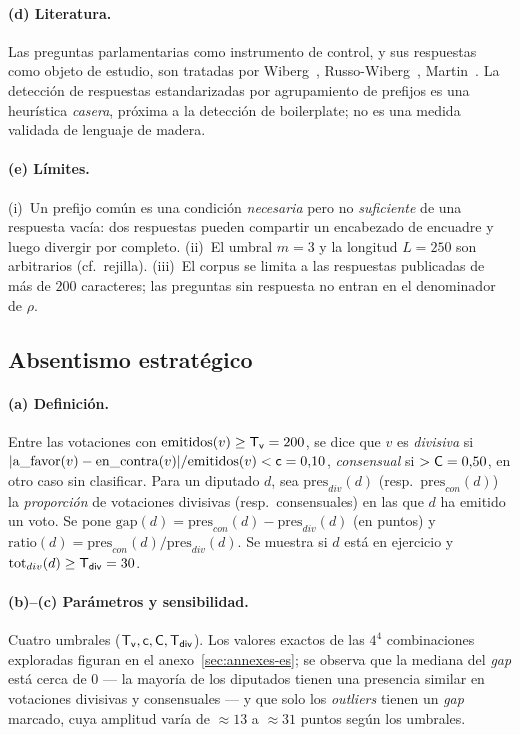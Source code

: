 \paragraph{(d) Literatura.} Las preguntas parlamentarias como instrumento de
control, y sus respuestas como objeto de estudio, son tratadas por
Wiberg~\cite{wiberg1995}, Russo-Wiberg~\cite{rw2010}, Martin~\cite{martin2011}. La
detección de respuestas estandarizadas por agrupamiento de prefijos es una
heurística \emph{casera}, próxima a la detección de \og{}boilerplate\fg{}; no es una
medida validada de \og{}lenguaje de madera\fg{}.

\paragraph{(e) Límites.} (i)~Un prefijo común es una condición \emph{necesaria} pero
no \emph{suficiente} de una respuesta \og{}vacía\fg{}: dos respuestas pueden
compartir un encabezado de encuadre y luego divergir por completo. (ii)~El umbral
$m=3$ y la longitud $L=250$ son arbitrarios (cf.~rejilla). (iii)~El corpus se limita
a las respuestas publicadas de más de $200$ caracteres; las preguntas sin respuesta
no entran en el denominador de $\rho$.

\subsection{Absentismo estratégico}\label{sec:absence-es}

\paragraph{(a) Definición.} Entre las votaciones con $\text{emitidos}(v)\ge \mathsf{T_v}=200$,
se dice que $v$ es \emph{divisiva} si
$|\mathrm{a\_favor}(v)-\mathrm{en\_contra}(v)|/\text{emitidos}(v)<\mathsf{c}=0{,}10$,
\emph{consensual} si $>\mathsf{C}=0{,}50$, en otro caso sin clasificar. Para un
diputado $d$, sea $\mathrm{pres}_{div}(d)$ (resp.\ $\mathrm{pres}_{con}(d)$) la
\emph{proporción} de votaciones divisivas (resp.\ consensuales) en las que $d$ ha
emitido un voto. Se pone $\mathrm{gap}(d)=\mathrm{pres}_{con}(d)-\mathrm{pres}_{div}(d)$
(en puntos) y $\mathrm{ratio}(d)=\mathrm{pres}_{con}(d)/\mathrm{pres}_{div}(d)$. Se
muestra si $d$ está en ejercicio y $\mathrm{tot}_{div}(d)\ge \mathsf{T_{div}}=30$.

\paragraph{(b)--(c) Parámetros y sensibilidad.} Cuatro umbrales
($\mathsf{T_v},\mathsf{c},\mathsf{C},\mathsf{T_{div}}$). Los valores exactos de las
$4^4$ combinaciones exploradas figuran en el anexo~\ref{sec:annexes-es}; se observa
que la mediana del \emph{gap} está cerca de $0$ — la mayoría de los diputados tienen
una presencia similar en votaciones divisivas y consensuales — y que solo los
\emph{outliers} tienen un \emph{gap} marcado, cuya amplitud varía de $\approx 13$ a
$\approx 31$ puntos según los umbrales.


